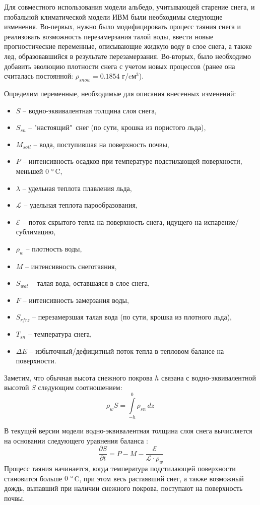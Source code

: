\documentclass[a4paper, fontsize=14pt]{scrartcl}
\begin{document}
Для совместного использования модели альбедо, учитывающей старение снега, и глобальной климатической модели ИВМ были необходимы следующие изменения. Во-первых, нужно было модифицировать процесс таяния снега и реализовать возможность перезамерзания талой воды, ввести новые прогностические переменные, описывающие жидкую воду в слое снега, а также лед, образовавшийся в результате перезамерзания. Во-вторых, было необходимо добавить эволюцию плотности снега с учетом новых процессов (ранее она считалась постоянной: $\rho_{snow} = 0.1854 $ г/cм$^3$).

Определим переменные, необходимые для описания внесенных изменений: 
\begin{itemize}
    \item $S$ -- водно-эквивалентная толщина слоя снега,
    \item $S_{sn}$ -- "настоящий"\  снег (по сути, крошка из пористого льда), 
    \item $M_{soil}$ -- вода, поступившая на поверхность почвы,
    \item $P$ -- интенсивность осадков при температуре подстилающей поверхности, меньшей $0 ~\degree$C,
    \item $\lambda$ -- удельная теплота плавления льда, 
    \item $\mathcal{L}$ -- удельная теплота парообразования, 
    \item $\mathcal{E}$ -- поток скрытого тепла на поверхность снега, идущего на испарение/сублимацию,
    \item $\rho_w$ -- плотность воды,
    \item $M$ -- интенсивность снеготаяния,
    \item $S_{wat}$ -- талая вода, оставшаяся в слое снега,
    \item $F$ -- интенсивность замерзания воды,
    \item $S_{rfrz}$ -- перезамерзшая талая вода (по сути, крошка из плотного льда),
    \item $T_{sn}$ -- температура снега, 
    \item $\Delta E$ -- избыточный/дефицитный поток тепла в тепловом балансе на поверхности.
\end{itemize}
Заметим, что обычная высота снежного покрова $h$ связана с водно-эквивалентной высотой $S$ следующим соотношением:
\begin{equation}
    \rho_w S =  \int\limits_{-h}^0 \rho_{sn} \, dz\  \label{sys}
\end{equation}

В текущей версии модели водно-эквивалентная толщина слоя снега вычисляется на основании следующего уравнения баланса \cite{Volodin1998, Volodina2000}:
\begin{equation}
    \dfrac{\partial S}{\partial t} = P - M - \dfrac{\mathcal{E}}{\mathcal{L} \cdot \rho_w}  \label{sys}
\end{equation}
Процесс таяния начинается, когда температура подстилающей поверхности становится больше $0 ~\degree$C, при этом весь растаявший снег, а также возможный дождь, выпавший при наличии снежного покрова, поступают на поверхность почвы.
\end{document}
